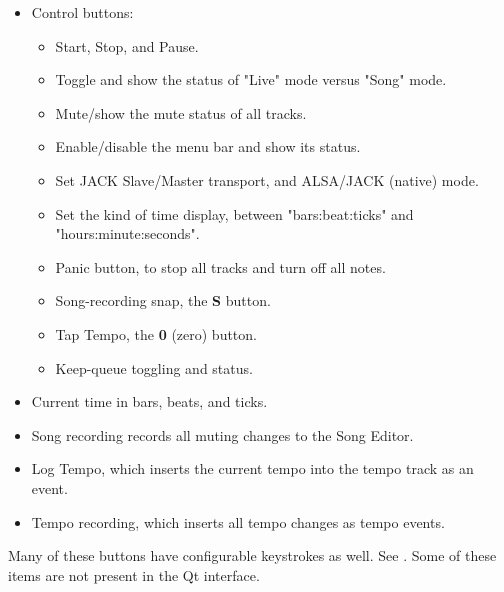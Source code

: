 \documentclass[
 11pt,
 twoside,
 a4paper,
 headinclude,
 footinclude,
 final                                 %
]{article}
\begin{document}
   \begin{itemize}
      \item Control buttons:
      \begin{itemize}
         \item Start, Stop, and Pause.
         \item Toggle and show the status of "Live" mode versus "Song" mode.
         \item Mute/show the mute status of all tracks.
         \item Enable/disable the menu bar and show its status.
         \item Set JACK Slave/Master transport, and
            ALSA/JACK (native) mode.
         \item Set the kind of time display, between "bars:beat:ticks"
            and "hours:minute:seconds".
         \item Panic button, to stop all tracks and turn off all notes.
         \item Song-recording snap, the \textbf{S} button.
         \item Tap Tempo, the \textbf{0} (zero) button.
         \item Keep-queue toggling and status.
      \end{itemize}
      \item Current time in bars, beats, and ticks.
      \item Song recording records all muting changes to the Song Editor.
      \item Log Tempo, which inserts the current tempo into the tempo track
         as an event.
      \item Tempo recording, which inserts all tempo changes as tempo events.
   \end{itemize}

   Many of these buttons have configurable keystrokes as well.
   See .
   Some of these items are not present in the Qt interface.

%


\rhead{\rightmark}         %
\end{document}

